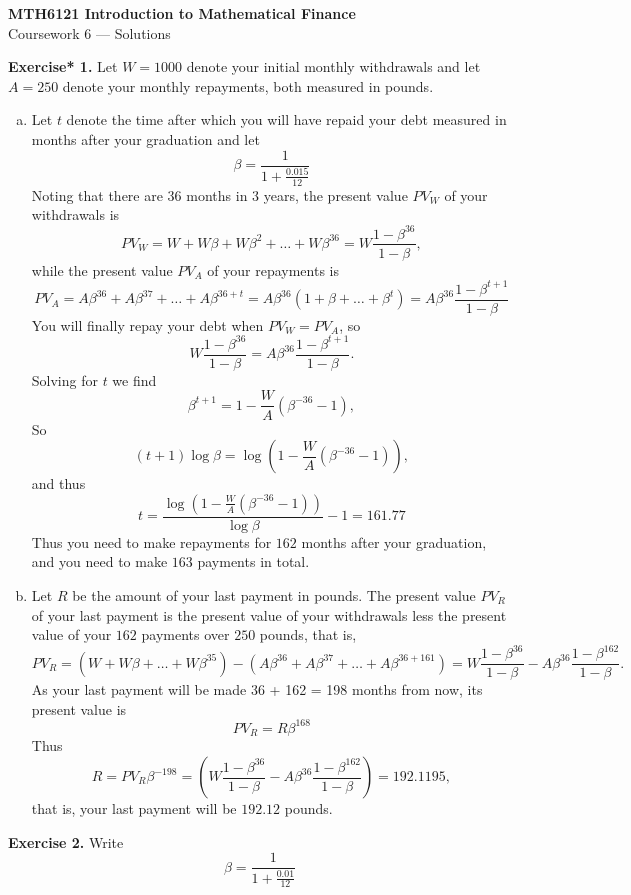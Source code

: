 \documentclass[11pt,a4paper]{report}
\begin{document}
    \begin{center}
        \LARGE\textbf{MTH6121 Introduction to Mathematical Finance}\\
        Coursework 6 — Solutions
    \end{center}
    \textbf{Exercise* 1.} Let $W = 1000$ denote your initial monthly withdrawals and let $A = 250$ denote your monthly repayments, both measured in pounds.
    \begin{enumerate}[(a)]
        \item Let $t$ denote the time after which you will have repaid your debt measured in months after your graduation and let
        $$\beta = \frac{1}{1+\frac{0.015}{12}}$$
        Noting that there are $36$ months in $3$ years, the present value $PV_W$ of your withdrawals is
        $$PV_W = W + W\beta + W\beta^2+\ldots+W\beta^{36} = W\frac{1-\beta^{36}}{1-\beta},$$
        while the present value $PV_A$ of your repayments is
        $$PV_A = A\beta^{36}+A\beta^{37}+\ldots+A\beta^{36+t} = A\beta^{36}(1+\beta+\ldots+\beta^t)=A\beta^{36}\frac{1-\beta^{t+1}}{1-\beta}$$
        You will finally repay your debt when $PV_W = PV_A$, so
        $$W\frac{1-\beta^{36}}{1-\beta} = A\beta^{36}\frac{1-\beta^{t+1}}{1-\beta}.$$
        Solving for $t$ we find
        $$\beta^{t+1} = 1 - \frac{W}{A}(\beta^{-36}-1),$$
        So
        $$(t+1)\log\beta = \log\left(1-\frac{W}{A}(\beta^{-36}-1)\right),$$
        and thus
        $$t = \frac{\log\left(1-\frac{W}{A}(\beta^{-36}-1)\right)}{\log\beta}-1=161.77$$
        Thus you need to make repayments for $162$ months after your graduation, and you need to make $163$ payments in total.
        \item Let $R$ be the amount of your last payment in pounds. The present value $PV_R$ of your last payment is the present value of your withdrawals less the present value of your $162$ payments over $250$ pounds, that is,
        $$PV_R = (W+W\beta+\ldots+W\beta^{35}) - (A\beta^{36}+A\beta^{37}+\ldots +A\beta^{36+161})=W\frac{1-\beta^{36}}{1-\beta}-A\beta^{36}\frac{1-\beta^{162}}{1-\beta}.$$
        As your last payment will be made 36 + 162 = 198 months from now, its present value is
        $$PV_R=R\beta^{168}$$
        Thus
        $$R=PV_R\beta^{-198} = \left(W\frac{1-\beta^{36}}{1-\beta}-A\beta^{36}\frac{1-\beta^{162}}{1-\beta}\right) = 192.1195,$$
        that is, your last payment will be $192.12$ pounds.
    \end{enumerate}
    \textbf{Exercise 2.} Write
    $$\beta = \frac{1}{1+\frac{0.01}{12}}$$
\end{document}

